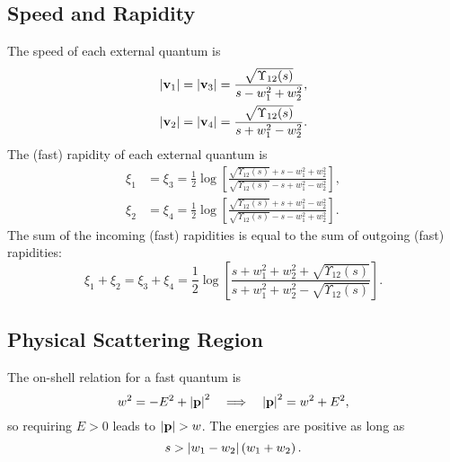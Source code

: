 \subsection{Speed and Rapidity}
The speed of each external quantum is
\begin{align}
	\left\lvert \mathbf{v}_{1} \right\rvert &= \left\lvert \mathbf{v}_{3} \right\rvert = \frac{\sqrt{\Upsilon_{12}(s)}}{s - w_{1}^{2} + w_{2}^{2}}, \\
	\left\lvert \mathbf{v}_{2} \right\rvert &= \left\lvert \mathbf{v}_{4} \right\rvert = \frac{\sqrt{\Upsilon_{12}(s)}}{s + w_{1}^{2} - w_{2}^{2}}.
\end{align}
The (fast) rapidity of each external quantum is
\begin{align}
	\xi_{1} &= \xi_{3} = \frac{1}{2} \log{\left[ \frac{\sqrt{\Upsilon_{12}(s)} + s - w_{1}^{2} + w_{2}^{2}}{\sqrt{\Upsilon_{12}(s)} - s + w_{1}^{2} - w_{2}^{2}} \right]}, \\
	\xi_{2} &= \xi_{4} = \frac{1}{2} \log{\left[ \frac{\sqrt{\Upsilon_{12}(s)} + s + w_{1}^{2} - w_{2}^{2}}{\sqrt{\Upsilon_{12}(s)} - s - w_{1}^{2} + w_{2}^{2}} \right]}.
\end{align}
The sum of the incoming (fast) rapidities is equal to the sum of outgoing (fast) rapidities:
\begin{equation}
	\xi_{1} + \xi_{2} = \xi_{3} + \xi_{4} = \frac{1}{2} \log{\left[ \frac{s + w_{1}^{2} + w_{2}^{2} + \sqrt{\Upsilon_{12}(s)}}{s + w_{1}^{2} + w_{2}^{2} - \sqrt{\Upsilon_{12}(s)}} \right]}.
\end{equation}
\subsection{Physical Scattering Region}
The on-shell relation for a fast quantum is
\begin{equation}
	w^{2} = -E^{2} + \left\lvert \mathbf{p} \right\rvert^{2} \quad \Longrightarrow \quad \left\lvert \mathbf{p} \right\rvert^{2} = w^{2} + E^{2},
\end{equation}
so requiring $E > 0$ leads to $\left\lvert \mathbf{p} \right\rvert > w$. The energies are positive as long as
\begin{equation}
	s > \left\lvert w_{1} - w_{2} \right\rvert \left( w_{1} + w_{2} \right).
\end{equation}
